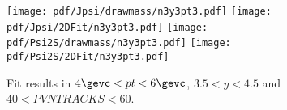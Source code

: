\begin{figure}[H]
\begin{center}
\texttt{[image: pdf/Jpsi/drawmass/n3y3pt3.pdf]}
\texttt{[image: pdf/Jpsi/2DFit/n3y3pt3.pdf]}
\vspace*{-0.5cm}
\texttt{[image: pdf/Psi2S/drawmass/n3y3pt3.pdf]}
\texttt{[image: pdf/Psi2S/2DFit/n3y3pt3.pdf]}
\vspace*{-0.5cm}
\end{center}
\caption{Fit results in $4\gevc<pt<6\gevc$, $3.5<y<4.5$ and $40<PVNTRACKS<60$.}
\label{Fitn3y3pt3}
\end{figure}

